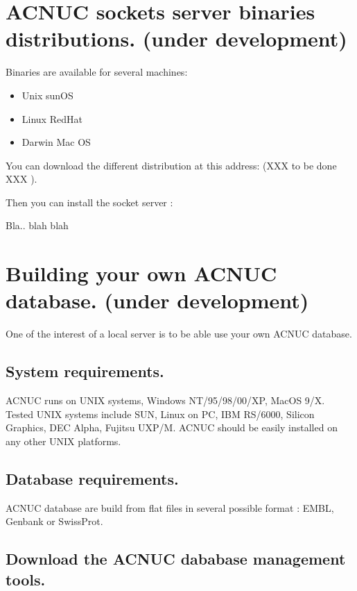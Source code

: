 \documentclass{article}
\begin{document}
\section{ACNUC sockets server binaries distributions. (under development)}

Binaries are available for several machines: 

\begin{itemize}
	\item  Unix sunOS
	\item  Linux RedHat
	\item Darwin Mac OS
\end{itemize}

You can download the different distribution at this address: 
(XXX to be done XXX ).

Then you can install the socket server :

Bla.. blah blah




\section{Building your own  ACNUC database. (under development)}
One of the interest of a local server is to be able use your own ACNUC
database.

 \subsection{System requirements.}
 
ACNUC runs on UNIX systems, Windows NT/95/98/00/XP, MacOS 9/X. Tested UNIX
systems include SUN, Linux on PC, IBM RS/6000, Silicon Graphics, DEC Alpha,
Fujitsu UXP/M. ACNUC should be easily installed on any other UNIX platforms. 

\subsection{Database requirements.}

ACNUC database are build from flat files in several possible format : EMBL, Genbank or
SwissProt.

\subsection{Download the ACNUC dababase management tools.}
 
\end{document}
